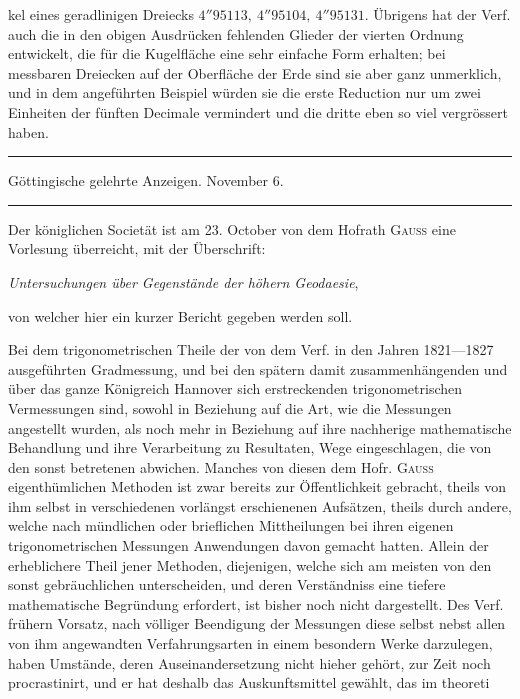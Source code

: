 %
kel eines geradlinigen Dreiecks \(4''95113,\ 4''95104,\ 4''95131\). Übrigens hat der Verf. auch die in den obigen Ausdrücken fehlenden Glieder der vierten Ordnung entwickelt, die für die Kugelfläche eine sehr einfache Form erhalten; bei messbaren Dreiecken auf der Oberfläche der Erde sind sie aber ganz unmerklich, und in dem angeführten Beispiel würden sie die erste Reduction nur um zwei Einheiten der fünften Decimale vermindert und die dritte eben so viel vergrössert haben.

\begin{center}
\rule{.85\textwidth}{.3pt}\par
Göttingische gelehrte Anzeigen. November 6.\par
\rule{.85\textwidth}{.3pt}
\end{center}
\hspace*{\parindent}Der königlichen Societät ist am 23. October von dem Hofrath \textsc{Gauss} eine Vorlesung überreicht, mit der Überschrift:
\begin{center}\textit{Untersuchungen über Gegenstände der höhern Geodaesie},\end{center}
\noindent von welcher hier ein kurzer Bericht gegeben werden soll.

Bei dem trigonometrischen Theile der von dem Verf. in den Jahren 1821---1827 ausgeführten Gradmessung, und bei den spätern damit zusammenhängenden und über das ganze Königreich Hannover sich erstreckenden trigonometrischen Vermessungen sind, sowohl in Beziehung auf die Art, wie die Messungen angestellt wurden, als noch mehr in Beziehung auf ihre nachherige mathematische Behandlung und ihre Verarbeitung zu Resultaten, Wege eingeschlagen, die von den sonst betretenen abwichen. Manches von diesen dem Hofr. \textsc{Gauss} eigenthümlichen Methoden ist zwar bereits zur Öffentlichkeit gebracht, theils von ihm selbst in verschiedenen vorlängst erschienenen Aufsätzen, theils durch andere, welche nach mündlichen oder brieflichen Mittheilungen bei ihren eigenen trigonometrischen Messungen Anwendungen davon gemacht hatten. Allein der erheblichere Theil jener Methoden, diejenigen, welche sich am meisten von den sonst gebräuchlichen unterscheiden, und deren Verständniss eine tiefere mathematische Begründung erfordert, ist bisher noch nicht dargestellt. Des Verf. frühern Vorsatz, nach völliger Beendigung der Messungen diese selbst nebst allen von ihm angewandten Verfahrungsarten in einem besondern Werke darzulegen, haben Umstände, deren Auseinandersetzung nicht hieher gehört, zur Zeit noch procrastinirt, und er hat deshalb das Auskunftsmittel gewählt, das im theoreti%
